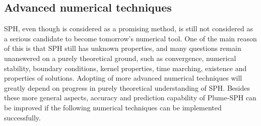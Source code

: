 \subsection{Advanced numerical techniques}
SPH, even though is considered as a promising method, is still not considered as a serious candidate to become tomorrow's numerical tool. One of the main reason of this is that SPH still has unknown properties, and many questions remain unanswered on a purely theoretical ground, such as convergence, numerical stability, boundary conditions, kernel properties, time marching, existence and properties of solutions.
Adopting of more advanced numerical techniques will greatly depend on progress in purely theoretical understanding of SPH. 
Besides these more general aspects, accuracy and prediction capability of Plume-SPH can be improved if the following numerical techniques can be implemented successfully. 
